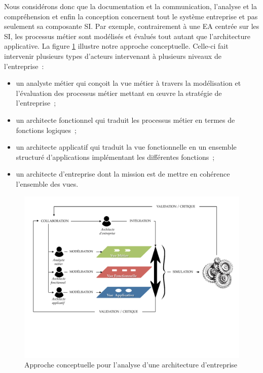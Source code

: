 Nous considérons donc que la documentation et la communication, l'analyse et la compréhension et enfin la conception concernent tout le système entreprise et pas seulement sa composante SI. Par exemple, contrairement à une EA centrée sur les SI, les processus métier sont modélisés et évalués tout autant que l'architecture applicative. La figure \ref{fig:approche_conceptuelle} illustre notre approche conceptuelle. Celle-ci fait intervenir plusieurs types d'acteurs intervenant à plusieurs niveaux de l'entreprise~:
\begin{itemize}
\item un analyste métier qui conçoit la vue métier à travers la modélisation et l'évaluation des processus métier mettant en œuvre la stratégie de l'entreprise~;
\item un architecte fonctionnel qui traduit les processus métier en termes de fonctions logiques~;
\item un architecte applicatif qui traduit la vue fonctionnelle en un ensemble structuré d'applications implémentant les différentes fonctions~;
\item un architecte d'entreprise dont la mission est de mettre en cohérence l'ensemble des vues.
\end{itemize}

\begin{figure}[!htbp]
 \begin{center}
  \includegraphics[trim= 0cm 5cm 0cm 0cm, width=1\textwidth]{images/demarche/approche_conceptuelle.pdf}
 \end{center}
 \caption{Approche conceptuelle pour l'analyse d'une architecture d'entreprise}
 \label{fig:approche_conceptuelle}
\end{figure}

